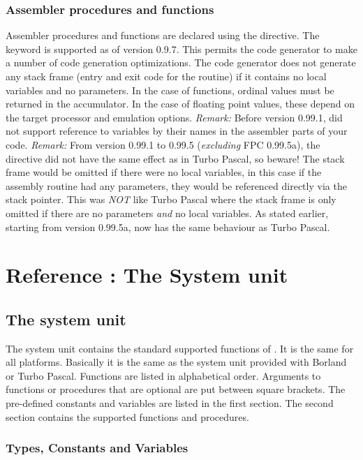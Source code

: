 \documentclass{report}
\begin{document}
\section{Assembler procedures and functions}
Assembler procedures and functions are declared using the
 directive. The  keyword is supported
as of version 0.9.7. This permits the code generator to make a number
of code generation optimizations.
The code generator does not generate any stack frame (entry and exit
code for the routine) if it contains no local variables and no
parameters. In the case of functions, ordinal values must be returned
in the accumulator. In the case of floating point values, these depend
on the target processor and emulation options.
\emph{ Remark: } Before version 0.99.1, \fpc did not support
reference to variables by their names in the assembler parts of your code.
\emph{ Remark: } From version 0.99.1 to 0.99.5 (\emph{excluding}
FPC 0.99.5a), the  directive did not have the
same effect as in Turbo Pascal, so beware! The stack frame would be
omitted if there were no local variables, in this case if the assembly
routine had any parameters, they would be referenced directly via the stack
pointer. This was \emph{ NOT} like Turbo Pascal where the stack frame is only
omitted if there are no parameters \emph{ and } no local variables. As
stated earlier, starting from version 0.99.5a, \fpc now has the same
behaviour as Turbo Pascal.
%
%
\part{Reference : The System unit}
\chapter{The system unit}
\label{ch:refchapter}
The system unit contains the standard supported functions of \fpc. It is the
same for all platforms. Basically it is the same as the system unit provided
with Borland or Turbo Pascal.
Functions are listed in alphabetical order.
Arguments to functions or procedures that are optional are put between
square brackets.
The pre-defined constants and variables are listed in the first section. The
second section contains the supported functions and procedures.
\section{Types, Constants and Variables}
\end{document}
